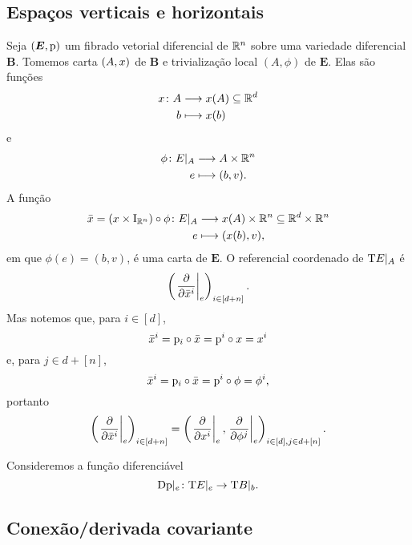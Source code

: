 \subsection{Espaços verticais e horizontais}

Seja $(\bm E,\mathrm{p})$ um fibrado vetorial diferencial de $\mathbb{R}^n$ sobre uma variedade diferencial $\bm B$. Tomemos carta $(A,x)$ de $\bm B$ e trivialização local $(A,\phi)$ de $\bm E$. Elas são funções
	\begin{align*}
	{x}\colon {A} &\longrightarrow {x(A) \subseteq \mathbb{R}^d} \\{b} &\longmapsto x(b)
	\end{align*}
e
	\begin{align*}
	{\phi}\colon {E|_A} &\longrightarrow {A \times \mathbb{R}^n} \\{e} &\longmapsto (b,v).
	\end{align*}
A função
	\begin{align*}
	{\bar x = (x\times \mathrm{I}_{\mathbb{R}^n}) \circ \phi}\colon {E|_A} &\longrightarrow {x(A) \times \mathbb{R}^n \subseteq \mathbb{R}^d \times \mathbb{R}^n} \\{e} &\longmapsto (x(b),v),
	\end{align*}
em que $\phi(e) = (b,v)$, é uma carta de $\bm E$. O referencial coordenado de $\mathrm{T} E|_A$ é
	\begin{equation*}
	\left( \left.{\frac{\partial{}}{\partial{\bar {x}^i}}}\right|_e \right)_{i \in [d+n]}.
	\end{equation*}
Mas notemos que, para $i \in [d]$,
	\begin{equation*}
	\bar {x}^i = \mathrm{p}_i \circ \bar {x} = \mathrm{p}^i \circ x = x^i
	\end{equation*}
e, para $j \in d+[n]$,
	\begin{equation*}
	\bar {x}^i = \mathrm{p}_i \circ \bar {x} = \mathrm{p}^i \circ \phi = \phi^i,
	\end{equation*}
portanto
	\begin{equation*}
	\left( \left.{\frac{\partial{}}{\partial{\bar {x}^i}}}\right|_e \right)_{i \in [d+n]} = \left( \left.{\frac{\partial{}}{\partial{x^i}}}\right|_e, \left.{\frac{\partial{}}{\partial{\phi^j}}}\right|_e \right)_{i \in [d], j \in d+[n]}.
	\end{equation*}

Consideremos a função diferenciável
	\begin{equation*}
	\mathrm{D} \mathrm{p}|_e \colon \mathrm{T} E|_e \to \mathrm{T} B|_b.
	\end{equation*}

















\subsection{Conexão/derivada covariante}


